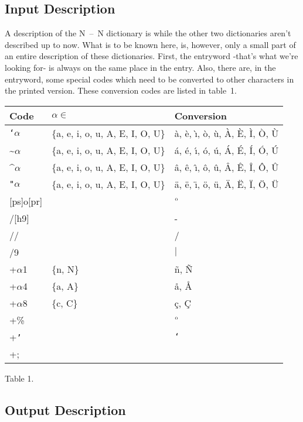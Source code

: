 \subsection{Input Description}
A description of the N~--~N dictionary is \cite{sm:descr} while the 
other two dictionaries aren't described up to now. What is to be known here, is,
however, only a small part of an entire description of these dictionaries. 
First, the 
entryword -that's what we're looking for- is always on the same place in the 
entry. Also, there are, in the entryword, some special codes which need to be 
converted to other characters in the printed version. These conversion codes 
are listed in table~1. 
\begin{center}
\begin{tabular}{|l|l|l|}\hline
 Code             
  & $\alpha \in$       
    & Conversion\\ \hline
 {\tt `}$\alpha$
  & \{a, e, i, o, u, A, E, I, O, U\}  
    & \`{a}, \`{e}, \`{\i}, \`{o}, \`{u}, \`{A}, \`{E}, \`{I}, \`{O}, \`{U}\\
 \~{}$\alpha$
  & \{a, e, i, o, u, A, E, I, O, U\}  
    & \'{a}, \'{e}, \'{\i}, \'{o}, \'{u}, \'{A}, \'{E}, \'{I}, \'{O}, \'{U}\\
 \^{}$\alpha$     
  & \{a, e, i, o, u, A, E, I, O, U\}  
    & \^{a}, \^{e}, \^{\i}, \^{o}, \^{u}, \^{A}, \^{E}, \^{I}, \^{O}, \^{U}\\
 {\tt "}$\alpha$  
  & \{a, e, i, o, u, A, E, I, O, U\}  
    & \"{a}, \"{e}, \"{\i}, \"{o}, \"{u}, \"{A}, \"{E}, \"{I}, \"{O}, \"{U}\\
 {[ps]o[pr]}&          & $^{\rm o}$ \\
 /[h9]      &          & -\\
 //         &          & /\\
 /9         &          & $|$\\
 +$\alpha$1 & \{n, N\} & \~{n}, \~{N}\\
 +$\alpha$4 & \{a, A\} & \aa, \AA \\
 +$\alpha$8 & \{c, C\} & \c{c}, \c{C}\\
 +\%        &          & $^{\rm o}$ \\
 +{\tt '}   &          & {\tt `}\\
 +;         &          & \\ \hline
\end{tabular}\vspace{1mm}

Table 1.
\end{center}
\subsection{Output Description}
